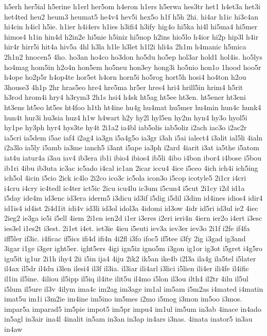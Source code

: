 {h5erh
her5ial
h5erine
h1erl
her5om
h4eron
h1ers
h5erwa
hes3tr
het1
h4et3a
het3i
het4ted
heu2
heum3
heumat5
he4v4
hev5i
hex5o
h1f
h5h
2hi.
hi4ar
h1ic
hi3c4an
hi4cin
h4icl
h5ie.
h1ier
h4i4ers
h1ies
h3ifi4
h3ify
hig4o
hi5ka
hi4l
hi5ma4
hi5mer
himos4
h1in
hin4d
h2in2e
hi5nie
h5iniz
hi5nop
h2ins
hio5lo
h4ior
hi2p
hip3l
h4ir
hir4r
hirr5i
hit4a
hiv5a
4hl
h3la
h1le
h3let
h1l2i
hli4a
2h1m
h4manic
h5mica
2h1n2
hnocen5
4ho.
ho3an
ho4co
ho3don
ho5du
ho5ep
hol3ar
hold1
hol4is.
ho5lys
ho4mag
hom5in
h2o4n
hon5em
ho5neu
hon3ey
hong3i
ho5nio
hon1o
1hood
hoo5r
h4ope
ho2p5r
h4op4te
hor5et
h4orn
horn5i
ho5rog
hort5h
hosi4
ho4ton
h2ou
3house3
4h1p
2hr
hras5eo
hre4
hre5ma
hr5er
hres4
hri4
hrill5in
hrim4
h5rit
h3rod
hrom4i
hry4
h3rym3
2h1s
hsi4
h4sk
ht5ag
ht5ee
ht3en.
ht5ener
ht3eni
ht3ens
ht5eo
ht5es
ht4foo
h1th
ht4ine
hu4g
hu4mat
hu5mer
hu4min
hun4c
hunk4
hun4t
hur3i
hu3sia
huz4
h1w
h4wart
h2y
hy2l
hyl5en
hy2m
hyn4
hy3o
hyol5i
hy1pe
hy3ph
hyr4
hys3te
hy4t
2i1a2
ia4bl
iab5olis
iab5oliz
i2ach
iac3o
i2ac2r
ia5cri
ia5dem
i5ae
iaf4
i2ag4
ia3gn
i5a4g5o
ia3gr
i3ah
i5ai
ialect4
i3alit
ial5li
4ialn
i2a3lo
ia5ly
i5amb
ia3me
ianch5
i3ant
i5ape
ia3ph
i2ard
4iarit
i3at
ia5the
i5atom
iat4u
iatur4a
i3au
iav4
ib3era
ib1i
ibio4
ibios4
ib5li
4ibo
i4bon
ibor4
i4bose
i5bou
ib1ri
4ibu
ib3uta
ic3ac
ic5ado
i4cal
ic1an
2icar
iccu4
4ice
i5ceo
4ich
ich4i
ich5ing
ich5ol
4icin
i5cio
2ick
ic4lo
2i2co
ico3c
ic5ola
icon3o
i5cop
icotyle5
2i1cr
i4cri
i4cru
i4cry
ic4tedl
ic4ter
ict5ic
2icu
icu4lu
ic3um
i5cun4
i5cut
2i1cy
i2d
id1a
i5day
ide4m
id3enc
id3era
iderm5
i3dicu
id3if
i5dig
i5dil
i3dim
id4ines
idios4
idir4
id1is4
id4ist
2i4d1it
idi4v
id3li
id3ol
idol3a
4idomi
id3ow
4idr
id5ri
id3ul
ie2
4iec
2ieg2
ie3ga
ie5i
i5ell
4iem
2i1en
ien2d
i1er
i3eres
i2eri
ieri4n
4iern
ier2o
i4ert
i3esc
ies3el
i1es2t
i3est.
2i1et
i4et.
iet3ie
4ieu
i5euti
iev3a
iev3er
iev3o
2i1f
i2fe
if4fa
iff5ler
if3ic.
i4ficac
if5ics
ifi4d
ifi4n
4i2fl
i3fo
ifoc5
if5tee
i3fy
2ig
i3gad
ig3and
3igar
i1ge
i3ger
ight5er.
ight5ers
4igi
ign5iz
igno5m
i3gon
ig1or
ig3ot
i5gret
i4g5ro
igu5it
ig1ur
2i1h
ihy4
2ii
i5in
ija4
4iju
2ik2
ik5an
ike4b
i2l3a
ila4g
ila5tel
i5later
il4ax
il5dr
il4du
i3len
ilesi4
il3f
il3ia.
il3iar
ili4arl
i3lici
i5lien
ili4er
ili4fe
il4ific
il1in
il5ine.
4iliou
il5ipp
il5iq
il4ite
ilit5u
il4mo
i5lon
il3ou
ilth4
il2tr
4ilu
il5ul
i5lum
il5ure
il3v
4ilym
ima4c
im2ag
im3age
im1al
im5am
i5m2as
i4mated
i4matin
imat5u
im1i
i3m2ie
im4ine
im5ino
im5mes
i2mo
i5mog
i3mon
im5oo
i3mos.
impar5a
imparad5
im5pie
impot5
im5pr
impu4
im1ul
im5um
in3ab
4inace
in4ado
in5agl
in3air
ina4l
4inalit
in5am
in3an
in3ap
in4ars
i3nas.
4inata
inator5
in3au
in4aw
}
